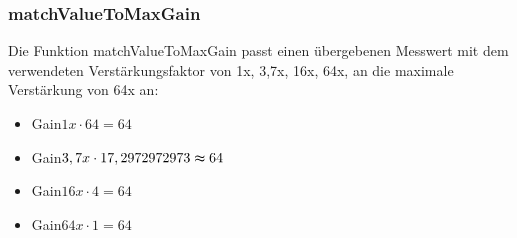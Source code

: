 \subsubsection{matchValueToMaxGain}\label{matchValueToMaxGain}
Die Funktion matchValueToMaxGain passt einen übergebenen Messwert mit dem verwendeten Verstärkungsfaktor von 1x, 3,7x, 16x, 64x, an die maximale Verstärkung von 64x an:
\begin{itemize}
	\item Gain$ 1x \cdot 64 = 64 $ 
	\item Gain$ 3,7x \cdot 17,2972972973 \thickapprox 64 $ 
	\item Gain$ 16x \cdot 4 = 64 $ 
	\item Gain$ 64x \cdot 1 = 64 $ 
\end{itemize}
